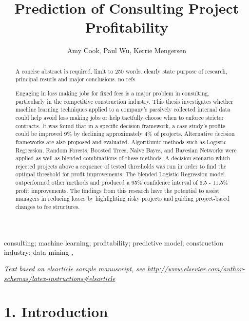 \documentclass[]{elsarticle} %
\begin{document}
\begin{frontmatter}

  \title{Prediction of Consulting Project Profitability}
    \author[Queensland University of Technology]{Amy Cook, Paul Wu, Kerrie Mengersen}
      \address[Queensland University of Technology]{School of Mathematical Sciences, George Street, Brisbane, QLD, 4000}
  
  \begin{abstract}
  A concise abstract is required. limit to 250 words. clearly state
  purpose of research, principal resutls and major conclusions. no refs
  
  Engaging in loss making jobs for fixed fees is a major problem in
  consulting, particularly in the competitive construction industry. This
  thesis investigates whether machine learning techniques applied to a
  company's passively collected internal data could help avoid loss making
  jobs or help tactfully choose when to enforce stricter contracts. It was
  found that in a specific decision framework, a case study's profits
  could be improved 9\% by declining approximately 4\% of projects.
  Alternative decision frameworks are also proposed and evaluated.
  Algorithmic methods such as Logistic Regression, Random Forests, Boosted
  Trees, Naive Bayes, and Bayesian Networks were applied as well as
  blended combinations of these methods. A decision scenario which
  rejected projects above a sequence of tested thresholds was run in order
  to find the optimal threshold for profit improvements. The blended
  Logistic Regression model outperformed other methods and produced a 95\%
  confidence interval of 6.5 - 11.5\% profit improvements. The findings
  from this research have the potential to assist managers in reducing
  losses by highlighting risky projects and guiding project-based changes
  to fee structures.
  \end{abstract}
   \begin{keyword} consulting; machine learning; profitability; predictive model;
construction industry; data mining \sep \end{keyword}
 \end{frontmatter}

\emph{Text based on elsarticle sample manuscript, see
\url{http://www.elsevier.com/author-schemas/latex-instructions\#elsarticle}}

\section{1. Introduction}\label{introduction}
\end{document}
